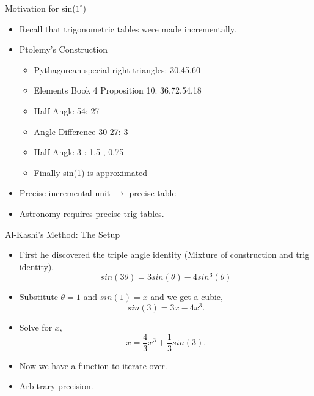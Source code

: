 \documentclass[10pt]{beamer}
\begin{document}
\begin{frame}{Motivation for sin($1^{\circ}$)}
  \begin{itemize}
    \item Recall that trigonometric tables were made incrementally. 
    \item Ptolemy's Construction
    \begin{itemize}
      \item Pythagorean special right triangles: 30,45,60
      \item Elements Book 4 Proposition 10: 36,72,54,18
      \item Half Angle 54: 27
      \item Angle Difference 30-27: 3
      \item Half Angle 3 : 1.5 , 0.75
      \item Finally sin(1) is approximated 
    \end{itemize}
    \item Precise incremental unit $\to$ precise table
    \item Astronomy requires precise trig tables. 
  \end{itemize}
\end{frame}

\begin{frame}{Al-Kashi's Method: The Setup}
  \begin{itemize}
    \item First he discovered the triple angle identity (Mixture of construction and trig identity).
    \begin{equation*}
      sin(3\theta) = 3sin(\theta) - 4sin^3(\theta) 
    \end{equation*}
    \item Substitute $\theta = 1$ and $sin(1) = x$ and we get a cubic,
    \begin{equation*}
      sin(3) = 3x - 4x^3.
    \end{equation*}
    \item Solve for $x$,
    \begin{equation*}
      x = \frac{4}{3}x^3 + \frac{1}{3} sin(3).
    \end{equation*}
    \item Now we have a function to iterate over.
    \item Arbitrary precision.
  \end{itemize}

\end{frame}
\end{document}
